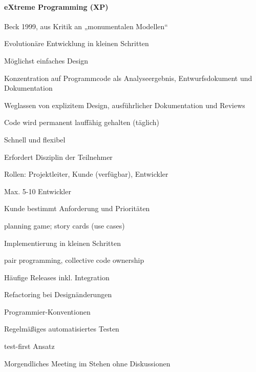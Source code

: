 \documentclass[a4paper]{article}
\begin{document}
\begin{multicols}{3}
  \paragraph{eXtreme Programming (XP)}
  \begin{itemize*}
    \item Beck 1999, aus Kritik an „monumentalen Modellen“
    \item Evolutionäre Entwicklung in kleinen Schritten
    \begin{itemize*}
      \item Möglichst einfaches Design
    \end{itemize*}
    \item Konzentration auf Programmcode als Analyseergebnis, Entwurfsdokument und Dokumentation
    \item Weglassen von explizitem Design, ausführlicher Dokumentation und Reviews
    \item Code wird permanent lauffähig gehalten (täglich)
    \item Schnell und flexibel
    \item Erfordert Disziplin der Teilnehmer
    \item Rollen: Projektleiter, Kunde (verfügbar), Entwickler
    \begin{itemize*}
      \item Max. 5-10 Entwickler
    \end{itemize*}
    \item Kunde bestimmt Anforderung und Prioritäten
    \begin{itemize*}
      \item planning game; story cards (use cases)
    \end{itemize*}
    \item Implementierung in kleinen Schritten
    \begin{itemize*}
      \item pair programming, collective code ownership
      \item Häufige Releases inkl. Integration
      \item Refactoring bei Designänderungen
      \item Programmier-Konventionen
    \end{itemize*}
    \item Regelmäßiges automatisiertes Testen
    \begin{itemize*}
      \item test-first Ansatz
    \end{itemize*}
    \item Morgendliches Meeting im Stehen ohne Diskussionen

\end{itemize*}
\end{multicols}
\end{document}
